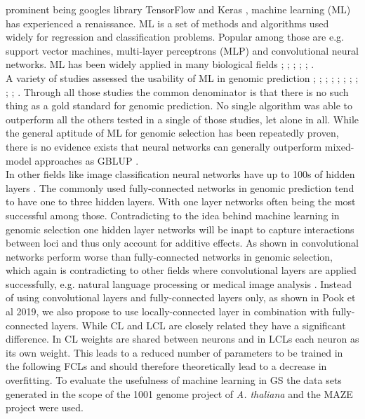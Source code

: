 prominent being googles library TensorFlow \cite{TF2016} and Keras \cite{keras2015},
machine learning (ML) has experienced a renaissance. ML is a set of methods and algorithms
used widely for regression and classification problems. Popular among those are
e.g. support vector machines, multi-layer perceptrons (MLP) and convolutional neural
networks. ML has been widely applied in many biological fields \cite{min2017deep};
\cite{lan2018survey}; \cite{mamoshina2016applications}; \cite{angermueller2016};
\cite{webb2018deep}; \cite{rampasek2016tensorflow}. \\
A variety of studies assessed the usability of ML in genomic prediction
\cite{gonzalez2018applications}; \cite{gonza2016}; \cite{ogutu2011comparison};
\cite{montesinos2019benchmarking}; \cite{grinberg2018evaluation}; \cite{cuevas2019deep};
\cite{montesinos2019new}; \cite{ma2017deepgs}; \cite{qiu2016application};
\cite{gonza2012}; \cite{li2018genomic}. Through all those studies the common denominator
is that there is no such thing as a gold standard for genomic prediction. No single
algorithm was able to outperform all the others tested in a single of those studies, let
alone in all. While the general aptitude of ML for genomic selection has been repeatedly
proven, there is no evidence exists that neural networks can generally outperform
mixed-model approaches as GBLUP \cite{hayes2001}. \\
In other fields like image classification neural networks have up to 100s of hidden layers
\cite{he2016deep}. The commonly used fully-connected networks in genomic prediction tend
to have one to three hidden layers. With one layer networks often being the most
successful among those. Contradicting to the idea behind machine learning in genomic
selection one hidden layer networks will be inapt to capture interactions between loci and
thus only account for additive effects. As shown in \cite{azodi2019} convolutional
networks perform worse than fully-connected networks in genomic selection, which again is
contradicting to other fields where convolutional layers are applied successfully, e.g.
natural language processing \cite{dos2014deep} or medical image analysis
\cite{litjens2017survey}. Instead of using convolutional layers and fully-connected layers
only, as shown in Pook et al 2019, we also propose to use locally-connected layer in
combination with fully-connected layers. While CL and LCL are closely related they have a
significant difference. In CL weights are shared between neurons and in LCLs each neuron
as its own weight. This leads to a reduced number of parameters to be trained in the
following FCLs and should therefore theoretically lead to a decrease in overfitting. To
evaluate the usefulness of machine learning in GS the data sets generated in the scope of
the 1001 genome project of \textit{A. thaliana} \cite{1001genome} and the MAZE project
were used.

